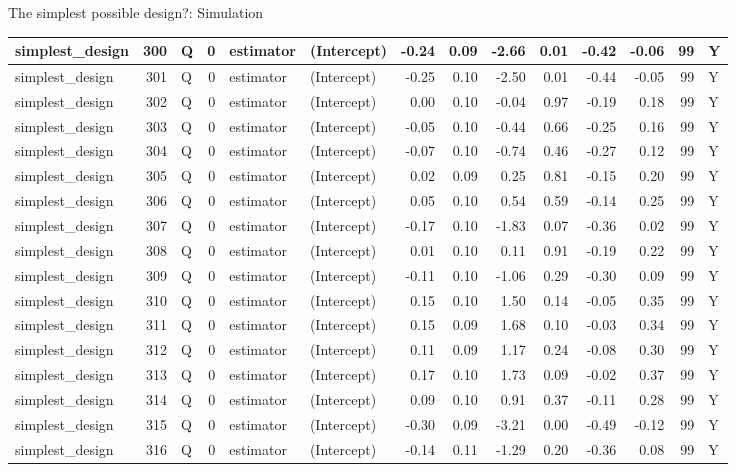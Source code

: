 \documentclass[
  11pt,
  ignorenonframetext,
]{beamer}
\begin{document}
\begin{frame}[fragile]{The simplest possible design?: Simulation}
\begin{tabular}{l|r|l|r|l|l|r|r|r|r|r|r|r|l}
\hline
simplest\_design & 300 & Q & 0 & estimator & (Intercept) & -0.24 & 0.09 & -2.66 & 0.01 & -0.42 & -0.06 & 99 & Y\\
\hline
simplest\_design & 301 & Q & 0 & estimator & (Intercept) & -0.25 & 0.10 & -2.50 & 0.01 & -0.44 & -0.05 & 99 & Y\\
\hline
simplest\_design & 302 & Q & 0 & estimator & (Intercept) & 0.00 & 0.10 & -0.04 & 0.97 & -0.19 & 0.18 & 99 & Y\\
\hline
simplest\_design & 303 & Q & 0 & estimator & (Intercept) & -0.05 & 0.10 & -0.44 & 0.66 & -0.25 & 0.16 & 99 & Y\\
\hline
simplest\_design & 304 & Q & 0 & estimator & (Intercept) & -0.07 & 0.10 & -0.74 & 0.46 & -0.27 & 0.12 & 99 & Y\\
\hline
simplest\_design & 305 & Q & 0 & estimator & (Intercept) & 0.02 & 0.09 & 0.25 & 0.81 & -0.15 & 0.20 & 99 & Y\\
\hline
simplest\_design & 306 & Q & 0 & estimator & (Intercept) & 0.05 & 0.10 & 0.54 & 0.59 & -0.14 & 0.25 & 99 & Y\\
\hline
simplest\_design & 307 & Q & 0 & estimator & (Intercept) & -0.17 & 0.10 & -1.83 & 0.07 & -0.36 & 0.02 & 99 & Y\\
\hline
simplest\_design & 308 & Q & 0 & estimator & (Intercept) & 0.01 & 0.10 & 0.11 & 0.91 & -0.19 & 0.22 & 99 & Y\\
\hline
simplest\_design & 309 & Q & 0 & estimator & (Intercept) & -0.11 & 0.10 & -1.06 & 0.29 & -0.30 & 0.09 & 99 & Y\\
\hline
simplest\_design & 310 & Q & 0 & estimator & (Intercept) & 0.15 & 0.10 & 1.50 & 0.14 & -0.05 & 0.35 & 99 & Y\\
\hline
simplest\_design & 311 & Q & 0 & estimator & (Intercept) & 0.15 & 0.09 & 1.68 & 0.10 & -0.03 & 0.34 & 99 & Y\\
\hline
simplest\_design & 312 & Q & 0 & estimator & (Intercept) & 0.11 & 0.09 & 1.17 & 0.24 & -0.08 & 0.30 & 99 & Y\\
\hline
simplest\_design & 313 & Q & 0 & estimator & (Intercept) & 0.17 & 0.10 & 1.73 & 0.09 & -0.02 & 0.37 & 99 & Y\\
\hline
simplest\_design & 314 & Q & 0 & estimator & (Intercept) & 0.09 & 0.10 & 0.91 & 0.37 & -0.11 & 0.28 & 99 & Y\\
\hline
simplest\_design & 315 & Q & 0 & estimator & (Intercept) & -0.30 & 0.09 & -3.21 & 0.00 & -0.49 & -0.12 & 99 & Y\\
\hline
simplest\_design & 316 & Q & 0 & estimator & (Intercept) & -0.14 & 0.11 & -1.29 & 0.20 & -0.36 & 0.08 & 99 & Y\\

\end{tabular}
\end{frame}
\end{document}
